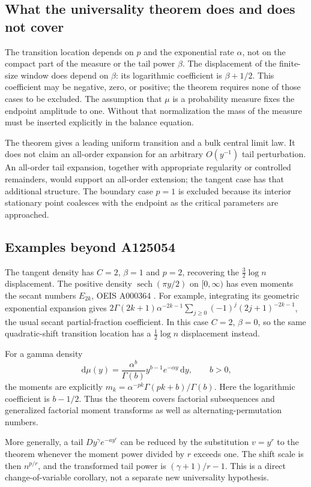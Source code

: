 \documentclass[11pt]{article}
\theoremstyle{definition}
\theoremstyle{remark}
\newcommand{\dd}{\,\mathrm d}
\newcommand{\sech}{\operatorname{sech}}
\begin{document}
\subsection{What the universality theorem does and does not cover}

The transition location depends on $p$ and the exponential rate $\alpha$,
not on the compact part of the measure or the tail power $\beta$.
The displacement of the finite-size window does depend on $\beta$:
its logarithmic coefficient is $\beta+1/2$.
This coefficient may be negative, zero, or positive; the theorem requires
none of those cases to be excluded.
The assumption that $\mu$ is a probability measure fixes the endpoint
amplitude to one.  Without that normalization the mass of the measure
must be inserted explicitly in the balance equation.

The theorem gives a leading uniform transition and a bulk central limit
law.  It does not claim an all-order expansion for an arbitrary
$O(y^{-1})$ tail perturbation.  An all-order tail expansion, together with
appropriate regularity or controlled remainders, would support an
all-order extension; the tangent case has that additional structure.
The boundary case $p=1$ is excluded because its interior stationary point
coalesces with the endpoint as the critical parameters are approached.

\subsection{Examples beyond A125054}

The tangent density has $C=2$, $\beta=1$ and $p=2$, recovering the
$\tfrac32\log n$ displacement.
The positive density $\sech(\pi y/2)$ on $[0,\infty)$ has even moments
the secant numbers $E_{2k}$, OEIS A000364 \cite{oeis364}.
For example, integrating its geometric exponential expansion gives
$2\Gamma(2k+1)\alpha^{-2k-1}\sum_{j\ge0}(-1)^j(2j+1)^{-2k-1}$,
the usual secant partial-fraction coefficient.  In this case $C=2$,
$\beta=0$, so the same quadratic-shift transition location has a
$\tfrac12\log n$ displacement instead.

For a gamma density
\[
 \dd\mu(y)=\frac{\alpha^b}{\Gamma(b)}y^{b-1}e^{-\alpha y}\dd y,
 \qquad b>0,
\]
the moments are explicitly
$m_k=\alpha^{-pk}\Gamma(pk+b)/\Gamma(b)$.
Here the logarithmic coefficient is $b-1/2$.
Thus the theorem covers factorial subsequences and generalized factorial
moment transforms as well as alternating-permutation numbers.

More generally, a tail $Dy^\gamma e^{-a y^r}$ can be reduced by the
substitution $v=y^r$ to the theorem whenever the moment power divided by
$r$ exceeds one.  The shift scale is then $n^{p/r}$, and the transformed
tail power is $(\gamma+1)/r-1$.  This is a direct change-of-variable
corollary, not a separate new universality hypothesis.
\end{document}
